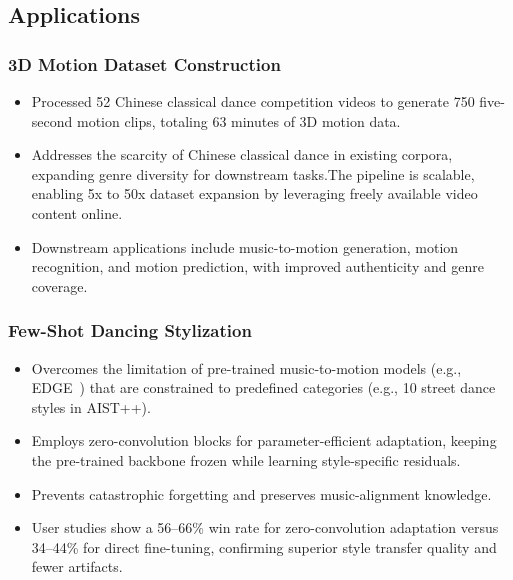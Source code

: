 \subsection{Applications}
\label{sec:applications}

\subsubsection{3D Motion Dataset Construction}
\begin{itemize}
\setlength{\itemsep}{-0.5ex} %
\setlength{\parsep}{0ex} %
    \item Processed 52 Chinese classical dance competition videos to generate 750 five-second motion clips, totaling 63 minutes of 3D motion data.~\cite{h3wb2014,amass2019,act2mo2020}
    \item Addresses the scarcity of Chinese classical dance in existing corpora, expanding genre diversity for downstream tasks.The pipeline is scalable, enabling 5x to 50x dataset expansion by leveraging freely available video content online.
    \item Downstream applications include music-to-motion generation, motion recognition, and motion prediction, with improved authenticity and genre coverage.
\end{itemize}

\subsubsection{Few-Shot Dancing Stylization}
\begin{itemize}
\setlength{\itemsep}{-0.5ex}
\setlength{\parsep}{0ex}
    \item Overcomes the limitation of pre-trained music-to-motion models (e.g., EDGE~\cite{edge2023}) that are constrained to predefined categories (e.g., 10 street dance styles in AIST++).
    \item Employs zero-convolution blocks for parameter-efficient adaptation, keeping the pre-trained backbone frozen while learning style-specific residuals.
    \item Prevents catastrophic forgetting and preserves music-alignment knowledge.
    \item User studies show a 56–66\% win rate for zero-convolution adaptation versus 34–44\% for direct fine-tuning, confirming superior style transfer quality and fewer artifacts.
\end{itemize}

